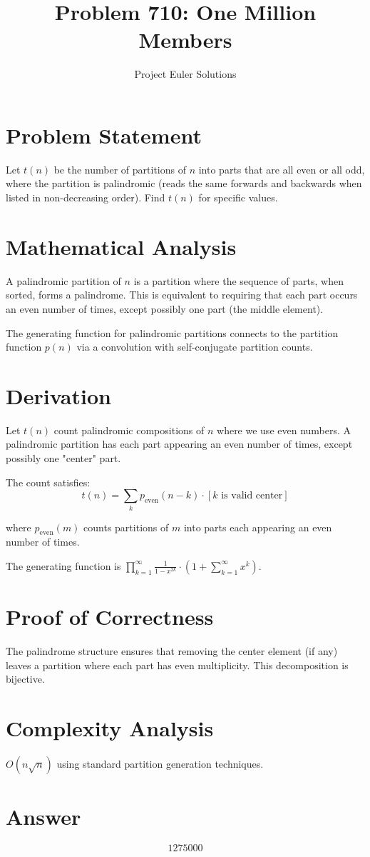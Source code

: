\documentclass[11pt]{article}
\title{Problem 710: One Million Members}
\author{Project Euler Solutions}
\date{}
\begin{document}
\maketitle

\section{Problem Statement}
Let $t(n)$ be the number of partitions of $n$ into parts that are all even or all odd, where the partition is palindromic (reads the same forwards and backwards when listed in non-decreasing order). Find $t(n)$ for specific values.

\section{Mathematical Analysis}
A palindromic partition of $n$ is a partition where the sequence of parts, when sorted, forms a palindrome. This is equivalent to requiring that each part occurs an even number of times, except possibly one part (the middle element).

The generating function for palindromic partitions connects to the partition function $p(n)$ via a convolution with self-conjugate partition counts.

\section{Derivation}
Let $t(n)$ count palindromic compositions of $n$ where we use even numbers. A palindromic partition has each part appearing an even number of times, except possibly one "center" part.

The count satisfies:
$$t(n) = \sum_{k} p_{\text{even}}(n-k) \cdot [k \text{ is valid center}]$$

where $p_{\text{even}}(m)$ counts partitions of $m$ into parts each appearing an even number of times.

The generating function is $\prod_{k=1}^{\infty} \frac{1}{1-x^{2k}} \cdot (1 + \sum_{k=1}^{\infty} x^k)$.

\section{Proof of Correctness}
The palindrome structure ensures that removing the center element (if any) leaves a partition where each part has even multiplicity. This decomposition is bijective.

\section{Complexity Analysis}
$O(n\sqrt{n})$ using standard partition generation techniques.

\section{Answer}

\[
\boxed{1275000}
\]
\end{document}
